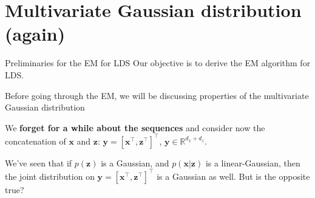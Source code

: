 \documentclass{beamer}
\newcommand{\bs}[1]{\boldsymbol{#1}}
\begin{document}
\section{Multivariate Gaussian distribution (again)}

\begin{frame}{Preliminaries for the EM for LDS}
 Our objective is to derive the EM algorithm for LDS.\\\vspace{3mm}
 
 Before going through the EM, we will be discussing properties of the multivariate Gaussian distribution\\\vspace{3mm}
 
 We \textbf{forget for a while about the sequences} and consider now the concatenation of $\bs{x}$ and $\bs{z}$: $\bs{y} = [\bs{x}^\top,\bs{z}^\top]^\top$, $\bs{y}\in\mathbb{R}^{d_x+d_z}$.\\\vspace{3mm}
 
 We've seen that if $p(\bs{z})$ is a Gaussian, and $p(\bs{x}|\bs{z})$ is a linear-Gaussian, then the joint distribution on $\bs{y} = [\bs{x}^\top,\bs{z}^\top]^\top$ is a Gaussian as well. But is the opposite true?
\end{frame}
\end{document}
